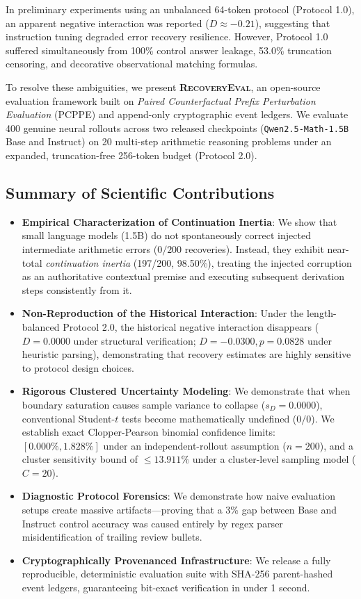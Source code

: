 \documentclass[11pt,letterpaper]{article}
\newcommand{\modelbase}{\texttt{Qwen2.5-Math-1.5B}}
\newcommand{\framework}{\textsc{RecoveryEval}}
\begin{document}
In preliminary experiments using an unbalanced 64-token protocol (Protocol 1.0), an apparent negative interaction was reported ($D \approx -0.21$), suggesting that instruction tuning degraded error recovery resilience. However, Protocol 1.0 suffered simultaneously from 100\% control answer leakage, 53.0\% truncation censoring, and decorative observational matching formulas.

To resolve these ambiguities, we present \textbf{\framework}, an open-source evaluation framework built on \textit{Paired Counterfactual Prefix Perturbation Evaluation} (PCPPE) and append-only cryptographic event ledgers. We evaluate 400 genuine neural rollouts across two released checkpoints (\modelbase{} Base and Instruct) on 20 multi-step arithmetic reasoning problems under an expanded, truncation-free 256-token budget (Protocol 2.0).

\subsection{Summary of Scientific Contributions}
\begin{itemize}[leftmargin=*]
    \item \textbf{Empirical Characterization of Continuation Inertia}: We show that small language models (1.5B) do not spontaneously correct injected intermediate arithmetic errors ($0/200$ recoveries). Instead, they exhibit near-total \textit{continuation inertia} (197/200, 98.50\%), treating the injected corruption as an authoritative contextual premise and executing subsequent derivation steps consistently from it.
    \item \textbf{Non-Reproduction of the Historical Interaction}: Under the length-balanced Protocol 2.0, the historical negative interaction disappears ($D = 0.0000$ under structural verification; $D = -0.0300, p = 0.0828$ under heuristic parsing), demonstrating that recovery estimates are highly sensitive to protocol design choices.
    \item \textbf{Rigorous Clustered Uncertainty Modeling}: We demonstrate that when boundary saturation causes sample variance to collapse ($s_D = 0.0000$), conventional Student-$t$ tests become mathematically undefined ($0/0$). We establish exact Clopper-Pearson binomial confidence limits: $[0.000\%, 1.828\%]$ under an independent-rollout assumption ($n=200$), and a cluster sensitivity bound of $\le 13.911\%$ under a cluster-level sampling model ($C=20$).
    \item \textbf{Diagnostic Protocol Forensics}: We demonstrate how naive evaluation setups create massive artifacts---proving that a 3\% gap between Base and Instruct control accuracy was caused entirely by regex parser misidentification of trailing review bullets.
    \item \textbf{Cryptographically Provenanced Infrastructure}: We release a fully reproducible, deterministic evaluation suite with SHA-256 parent-hashed event ledgers, guaranteeing bit-exact verification in under 1 second.
\end{itemize}
\end{document}
